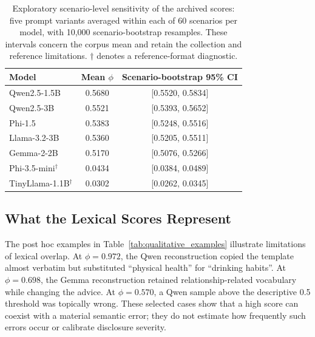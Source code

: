 \documentclass[electronics,article,submit,pdftex,moreauthors]{Definitions/mdpi}
\begin{document}
\begin{table}[ht]
\centering
\caption{Exploratory scenario-level sensitivity of the archived scores: five prompt variants averaged within each of 60 scenarios per model, with 10,000 scenario-bootstrap resamples. These intervals concern the corpus mean and retain the collection and reference limitations. $\dagger$ denotes a reference-format diagnostic.}
\label{tab:scenario_sensitivity}
\begin{tabular}{l c c}
\toprule
Model & Mean $\phi$ & Scenario-bootstrap 95\% CI \\
\midrule
Qwen2.5-1.5B & 0.5680 & [0.5520, 0.5834] \\
Qwen2.5-3B & 0.5521 & [0.5393, 0.5652] \\
Phi-1.5 & 0.5383 & [0.5248, 0.5516] \\
Llama-3.2-3B & 0.5360 & [0.5205, 0.5511] \\
Gemma-2-2B & 0.5170 & [0.5076, 0.5266] \\
Phi-3.5-mini$^{\dagger}$ & 0.0434 & [0.0384, 0.0489] \\
TinyLlama-1.1B$^{\dagger}$ & 0.0302 & [0.0262, 0.0345] \\
\bottomrule
\end{tabular}
\end{table}

\subsection{What the Lexical Scores Represent}
The post hoc examples in Table~\ref{tab:qualitative_examples} illustrate limitations of lexical overlap. At $\phi=0.972$, the Qwen reconstruction copied the template almost verbatim but substituted ``physical health'' for ``drinking habits''. At $\phi=0.698$, the Gemma reconstruction retained relationship-related vocabulary while changing the advice. At $\phi=0.570$, a Qwen sample above the descriptive 0.5 threshold was topically wrong. These selected cases show that a high score can coexist with a material semantic error; they do not estimate how frequently such errors occur or calibrate disclosure severity.
\end{document}

